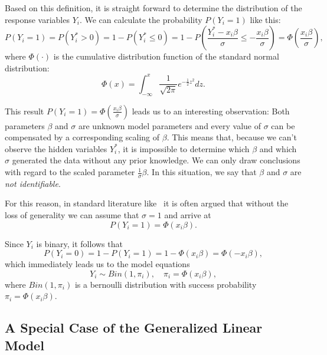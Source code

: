 \noindent Based on this definition, it is straight forward to determine the
distribution of the response variables $Y_i$.
We can calculate the probability $P(Y_i = 1)$ like this:
\begin{equation*}
    P(Y_i = 1) = P(Y_i^\ast > 0) = 1 - P(Y_i^\ast \leq 0)
    = 1 - P\left(\frac{Y_i^\ast - x_i \beta}{\sigma} \leq -\frac{x_i \beta}{\sigma} \right)
    = \Phi\left(\frac{x_i \beta}{\sigma} \right),
\end{equation*}
where $\Phi(\cdot)$ is the cumulative distribution function of the standard normal
distribution:
\begin{equation*}
    \Phi(x) = \int_{-\infty}^x \frac{1}{\sqrt{2 \pi}} e^{- \frac{1}{2} z^2} dz.
\end{equation*}

\noindent This result $P(Y_i = 1) = \Phi\left(\frac{x_i \beta}{\sigma} \right)$
leads us to an interesting observation:
Both parameters $\beta$ and $\sigma$ are unknown model parameters and
every value of $\sigma$ can be compensated by a corresponding scaling
of $\beta$. This means that, because we can't observe the hidden variables $Y_i^\ast$,
it is impossible to determine which $\beta$ and which $\sigma$
generated the data without any prior knowledge.
We can only draw conclusions with regard to the
scaled parameter $\frac{1}{\sigma}\beta$.
In this situation, we say that $\beta$ and $\sigma$ are
\textit{not identifiable}.

For this reason, in standard literature like~\cite{regression-fahrmeir} it is
often argued that without the loss of generality we can assume that
$\sigma = 1$ and arrive at
\begin{equation}
    P(Y_i = 1) = \Phi(x_i \beta).
\end{equation}

\noindent{}Since $Y_i$ is binary, it follows that
\begin{equation*}
    P(Y_i = 0) = 1 - P(Y_i = 1) = 1 - \Phi(x_i \beta) = \Phi(-x_i \beta),
\end{equation*}
which immediately leads us to the model equations
\begin{equation}
    \label{eq:probit-model}
    Y_i \sim Bin(1, \pi_i), \quad \pi_i = \Phi(x_i \beta),
\end{equation}
where $Bin(1, \pi_i)$ is a bernoulli distribution with success
probability $\pi_i = \Phi(x_i \beta)$.

\subsection{A Special Case of the Generalized Linear Model}


